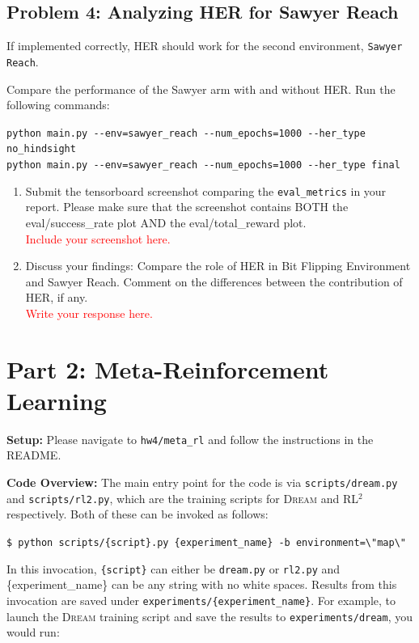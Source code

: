\documentclass[12pt]{article}
\newcommand{\rl}{{RL$^2$ }}
\newcommand{\dream}{\textsc{Dream }}
\begin{document}
\subsection*{Problem 4: Analyzing HER for Sawyer Reach}
If implemented correctly, HER should work for the second environment, \texttt{Sawyer Reach}.

Compare the performance of the Sawyer arm with and without HER. Run the following commands:

\verb|python main.py --env=sawyer_reach --num_epochs=1000 --her_type no_hindsight| \\
\verb|python main.py --env=sawyer_reach --num_epochs=1000 --her_type final|


\begin{enumerate}[label=\alph*)]
    \item Submit the tensorboard screenshot comparing the \texttt{eval\_metrics} in your report. Please make sure that the screenshot contains BOTH the eval/success\_rate plot AND the eval/total\_reward plot.\\
    \textcolor{red}{Include your screenshot here.}
    \item Discuss your findings: Compare the role of HER in Bit Flipping Environment and Sawyer Reach. Comment on the differences between the contribution of HER, if any. \\
    \textcolor{red}{Write your response here.}
\end{enumerate}

\newpage

\section*{Part 2: Meta-Reinforcement Learning}

\textbf{Setup:} Please navigate to \texttt{hw4/meta\_rl} and follow the instructions in the README. 

\textbf{Code Overview:} The main entry point for the code is via \texttt{scripts/dream.py} and \texttt{scripts/rl2.py}, which are the training scripts for \dream and \rl respectively.
Both of these can be invoked as follows:

\texttt{\$ python scripts/\{script\}.py \{experiment\_name\} -b environment=\textbackslash"map\textbackslash"}

In this invocation, \texttt{\{script\}} can either be \texttt{dream.py} or \texttt{rl2.py} and \{experiment\_name\} can be any string with no white spaces. Results from this invocation are saved under \texttt{experiments/\{experiment\_name\}}.
For example, to launch the \dream training script and save the results to \texttt{experiments/dream}, you would run:
\end{document}

